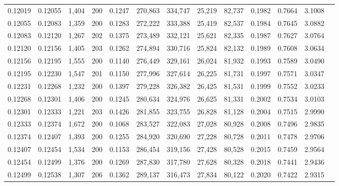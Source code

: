 \begin{tabular}{rrrrrrrrrrrrr}
0.12019 & 0.12055 & 1,404 & 200 &                                     0.1247 & 270,863 & 334,747 &  25,219 &  82,737 & 0.1982 & 0.7664 & 3.1008 \\
0.12055 & 0.12083 & 1,359 & 200 &                                     0.1283 & 272,222 & 333,388 &  25,419 &  82,537 & 0.1984 & 0.7645 & 3.0882 \\
0.12083 & 0.12120 & 1,267 & 202 &                                     0.1375 & 273,489 & 332,121 &  25,621 &  82,335 & 0.1987 & 0.7627 & 3.0764 \\
0.12120 & 0.12156 & 1,405 & 203 &                                     0.1262 & 274,894 & 330,716 &  25,824 &  82,132 & 0.1989 & 0.7608 & 3.0634 \\
0.12156 & 0.12195 & 1,555 & 200 &                                     0.1140 & 276,449 & 329,161 &  26,024 &  81,932 & 0.1993 & 0.7589 & 3.0490 \\
0.12195 & 0.12230 & 1,547 & 201 &                                     0.1150 & 277,996 & 327,614 &  26,225 &  81,731 & 0.1997 & 0.7571 & 3.0347 \\
0.12231 & 0.12268 & 1,232 & 200 &                                     0.1397 & 279,228 & 326,382 &  26,425 &  81,531 & 0.1999 & 0.7552 & 3.0233 \\
0.12268 & 0.12301 & 1,406 & 200 &                                     0.1245 & 280,634 & 324,976 &  26,625 &  81,331 & 0.2002 & 0.7534 & 3.0103 \\
0.12301 & 0.12333 & 1,221 & 203 &                                     0.1426 & 281,855 & 323,755 &  26,828 &  81,128 & 0.2004 & 0.7515 & 2.9990 \\
0.12333 & 0.12374 & 1,672 & 200 &                                     0.1068 & 283,527 & 322,083 &  27,028 &  80,928 & 0.2008 & 0.7496 & 2.9835 \\
0.12374 & 0.12407 & 1,393 & 200 &                                     0.1255 & 284,920 & 320,690 &  27,228 &  80,728 & 0.2011 & 0.7478 & 2.9706 \\
0.12407 & 0.12454 & 1,534 & 200 &                                     0.1153 & 286,454 & 319,156 &  27,428 &  80,528 & 0.2015 & 0.7459 & 2.9564 \\
0.12454 & 0.12499 & 1,376 & 200 &                                     0.1269 & 287,830 & 317,780 &  27,628 &  80,328 & 0.2018 & 0.7441 & 2.9436 \\
0.12499 & 0.12538 & 1,307 & 206 &                                     0.1362 & 289,137 & 316,473 &  27,834 &  80,122 & 0.2020 & 0.7422 & 2.9315 \\

\end{tabular}
